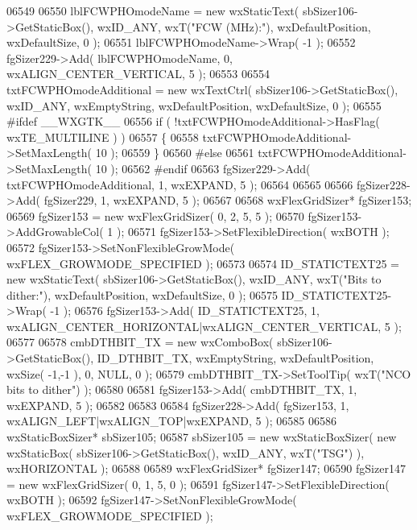 \begin{DoxyCode}
06549     
06550     lblFCWPHOmodeName = \textcolor{keyword}{new} wxStaticText( sbSizer106->GetStaticBox(), wxID\_ANY, wxT(\textcolor{stringliteral}{"FCW (MHz):"}), 
      wxDefaultPosition, wxDefaultSize, 0 );
06551     lblFCWPHOmodeName->Wrap( -1 );
06552     fgSizer229->Add( lblFCWPHOmodeName, 0, wxALIGN\_CENTER\_VERTICAL, 5 );
06553     
06554     txtFCWPHOmodeAdditional = \textcolor{keyword}{new} wxTextCtrl( sbSizer106->GetStaticBox(), wxID\_ANY, wxEmptyString, 
      wxDefaultPosition, wxDefaultSize, 0 );
06555 \textcolor{preprocessor}{    #ifdef \_\_WXGTK\_\_}
06556     \textcolor{keywordflow}{if} ( !txtFCWPHOmodeAdditional->HasFlag( wxTE\_MULTILINE ) )
06557     \{
06558     txtFCWPHOmodeAdditional->SetMaxLength( 10 );
06559     \}
06560 \textcolor{preprocessor}{    #else}
06561     txtFCWPHOmodeAdditional->SetMaxLength( 10 );
06562 \textcolor{preprocessor}{    #endif}
06563     fgSizer229->Add( txtFCWPHOmodeAdditional, 1, wxEXPAND, 5 );
06564     
06565     
06566     fgSizer228->Add( fgSizer229, 1, wxEXPAND, 5 );
06567     
06568     wxFlexGridSizer* fgSizer153;
06569     fgSizer153 = \textcolor{keyword}{new} wxFlexGridSizer( 0, 2, 5, 5 );
06570     fgSizer153->AddGrowableCol( 1 );
06571     fgSizer153->SetFlexibleDirection( wxBOTH );
06572     fgSizer153->SetNonFlexibleGrowMode( wxFLEX\_GROWMODE\_SPECIFIED );
06573     
06574     ID_STATICTEXT25 = \textcolor{keyword}{new} wxStaticText( sbSizer106->GetStaticBox(), wxID\_ANY, wxT(\textcolor{stringliteral}{"Bits to dither:"}), 
      wxDefaultPosition, wxDefaultSize, 0 );
06575     ID_STATICTEXT25->Wrap( -1 );
06576     fgSizer153->Add( ID_STATICTEXT25, 1, wxALIGN\_CENTER\_HORIZONTAL|wxALIGN\_CENTER\_VERTICAL, 5 );
06577     
06578     cmbDTHBIT_TX = \textcolor{keyword}{new} wxComboBox( sbSizer106->GetStaticBox(), ID_DTHBIT_TX, wxEmptyString, 
      wxDefaultPosition, wxSize( -1,-1 ), 0, NULL, 0 ); 
06579     cmbDTHBIT_TX->SetToolTip( wxT(\textcolor{stringliteral}{"NCO bits to dither"}) );
06580     
06581     fgSizer153->Add( cmbDTHBIT_TX, 1, wxEXPAND, 5 );
06582     
06583     
06584     fgSizer228->Add( fgSizer153, 1, wxALIGN\_LEFT|wxALIGN\_TOP|wxEXPAND, 5 );
06585     
06586     wxStaticBoxSizer* sbSizer105;
06587     sbSizer105 = \textcolor{keyword}{new} wxStaticBoxSizer( \textcolor{keyword}{new} wxStaticBox( sbSizer106->GetStaticBox(), wxID\_ANY, wxT(\textcolor{stringliteral}{"TSG"}) ),
       wxHORIZONTAL );
06588     
06589     wxFlexGridSizer* fgSizer147;
06590     fgSizer147 = \textcolor{keyword}{new} wxFlexGridSizer( 0, 1, 5, 0 );
06591     fgSizer147->SetFlexibleDirection( wxBOTH );
06592     fgSizer147->SetNonFlexibleGrowMode( wxFLEX\_GROWMODE\_SPECIFIED );

\end{DoxyCode}
